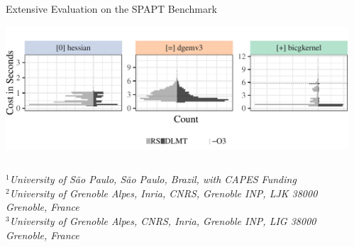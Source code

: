 \documentclass[11pt, compress, aspectratio=169, xcolor={table,usenames,dvipsnames}]{beamer}
\begin{document}
\begin{frame}
\begin{columns}
\begin{column}{0.89\columnwidth}
\begin{columns}
\begin{column}[t]{0.48\columnwidth}
\begin{block}{ \vphantom{g}Extensive Evaluation on the SPAPT Benchmark}
\begin{center}
\begin{center}
\includegraphics[width=0.85\columnwidth]{../../../img/split_histograms.pdf}
\end{center}
\end{center}
\end{block}
\end{column}
\end{columns}
\begin{flushleft}
\vspace{1.3em}
  {\small
    \textit{$^{1}$University of São Paulo, São Paulo, Brazil, with CAPES Funding \\
      $^{2}$University of Grenoble Alpes, Inria, CNRS, Grenoble INP, LJK 38000 Grenoble, France \\[-0.2em]
      $^{3}$University of Grenoble Alpes, CNRS, Inria, Grenoble INP, LIG 38000 Grenoble, France
    }
  }
\end{flushleft}
\end{column}
\begin{column}{0.09\columnwidth}
\end{column}
\end{columns}
\end{frame}
\end{document}
